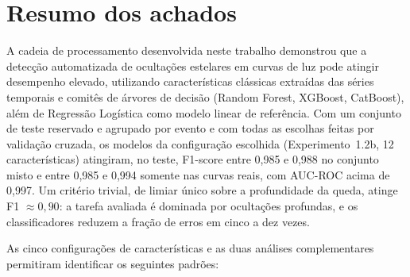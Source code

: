 \section{Resumo dos achados}

A cadeia de processamento desenvolvida neste trabalho demonstrou que a detecção automatizada de ocultações estelares em curvas de luz pode atingir desempenho elevado, utilizando características clássicas extraídas das séries temporais e comitês de árvores de decisão (Random Forest, XGBoost, CatBoost), além de Regressão Logística como modelo linear de referência. Com um conjunto de teste reservado e agrupado por evento e com todas as escolhas feitas por validação cruzada, os modelos da configuração escolhida (Experimento~1.2b, 12 características) atingiram, no teste, F1-score entre 0,985 e 0,988 no conjunto misto e entre 0,985 e 0,994 somente nas curvas reais, com AUC-ROC acima de 0,997. Um critério trivial, de limiar único sobre a profundidade da queda, atinge F1 $\approx 0{,}90$: a tarefa avaliada é dominada por ocultações profundas, e os classificadores reduzem a fração de erros em cinco a dez vezes.

As cinco configurações de características e as duas análises complementares permitiram identificar os seguintes padrões:

